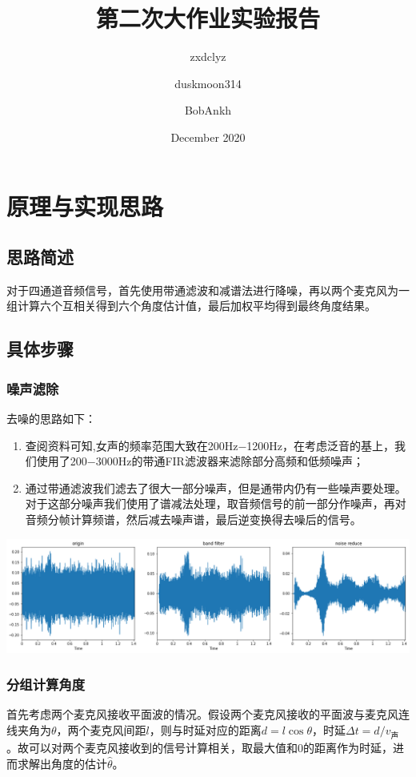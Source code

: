 \documentclass[a4paper]{ctexart}
\title{\textbf{第二次大作业实验报告}}
\author{
zxdclyz
\and
duskmoon314
\and
BobAnkh
}
\date{December 2020}
\begin{document}
\pagestyle{plain}

\maketitle

\section{原理与实现思路}

\subsection{思路简述}

对于四通道音频信号，首先使用带通滤波和减谱法进行降噪，再以两个麦克风为一组计算六个互相关得到六个角度估计值，最后加权平均得到最终角度结果。

\subsection{具体步骤}
\subsubsection{噪声滤除}
去噪的思路如下：
\begin{enumerate}
    \item 查阅资料可知,女声的频率范围大致在200Hz$-$1200Hz，在考虑泛音的基上，我们使用了200$-$3000Hz的带通FIR滤波器来滤除部分高频和低频噪声；
    \item 通过带通滤波我们滤去了很大一部分噪声，但是通带内仍有一些噪声要处理。对于这部分噪声我们使用了谱减法处理，取音频信号的前一部分作噪声，再对音频分帧计算频谱，然后减去噪声谱，最后逆变换得去噪后的信号。
\end{enumerate}
\centerline{\includegraphics[scale=0.4]{noisereduce.png}}
\subsubsection{分组计算角度}

首先考虑两个麦克风接收平面波的情况。假设两个麦克风接收的平面波与麦克风连线夹角为$\theta$，两个麦克风间距$l$，则与时延对应的距离$d=l \cos{\theta}$，时延$\Delta t = d / v_{\text{声}}$。故可以对两个麦克风接收到的信号计算相关，取最大值和0的距离作为时延，进而求解出角度的估计$\hat{\theta}$。
\end{document}
